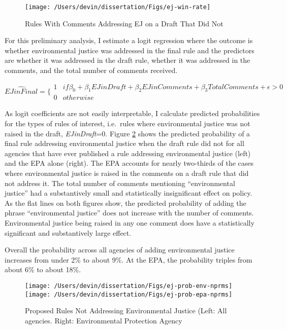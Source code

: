 \documentclass[
      12pt,
        ]{article}
\begin{document}
\begin{figure}

{\centering \texttt{[image: /Users/devin/dissertation/Figs/ej-win-rate]} 

}

\caption{Rules With Comments Addressing EJ on a Draft That Did Not}\label{fig:ejwinrate}
\end{figure}

For this preliminary analysis, I estimate a logit regression where the
outcome is whether environmental justice was addressed in the final rule
and the predictors are whether it was addressed in the draft rule,
whether it was addressed in the comments, and the total number of
comments received.

\[ \hat{EJ in Final} = \Bigg\{ \begin{array}{ll}
1 & if \beta_0 + \beta_1 EJ in Draft + \beta_2 EJ in Comments + \beta_3 Total Comments  + \epsilon > 0\\
0 & otherwise 
  \end{array}\]

As logit coefficients are not easily interpretable, I calculate
predicted probabilities for the types of rules of interest, i.e.~rules
where environmental justice was not raised in the draft, \emph{EJinDraft}=0.
Figure \ref{fig:ejpredicted} shows the predicted probability of a final rule
addressing environmental justice when the draft rule did not for all
agencies that have ever published a rule addressing environmental
justice (left) and the EPA alone (right). The EPA accounts for nearly
two-thirds of the cases where environmental justice is raised in the
comments on a draft rule that did not address it. The total number of
comments mentioning ``environmental justice'' had a substantively small
and statistically insignificant effect on policy. As the flat lines on
both figures show, the predicted probability of adding the phrase
``environmental justice'' does not increase with the number of comments.
Environmental justice being raised in any one comment does have a
statistically significant and substantively large effect.

Overall the probability across all agencies of adding environmental
justice increases from under 2\% to about 9\%. At the EPA, the probability
triples from about 6\% to about 18\%.

\begin{figure}

{\centering \texttt{[image: /Users/devin/dissertation/Figs/ej-prob-env-nprms]} \texttt{[image: /Users/devin/dissertation/Figs/ej-prob-epa-nprms]} 

}

\caption{Proposed Rules Not Addressing Environmental Justice (Left: All agencies. Right: Environmental Protection Agency}\label{fig:ejpredicted}
\end{figure}
\end{document}
